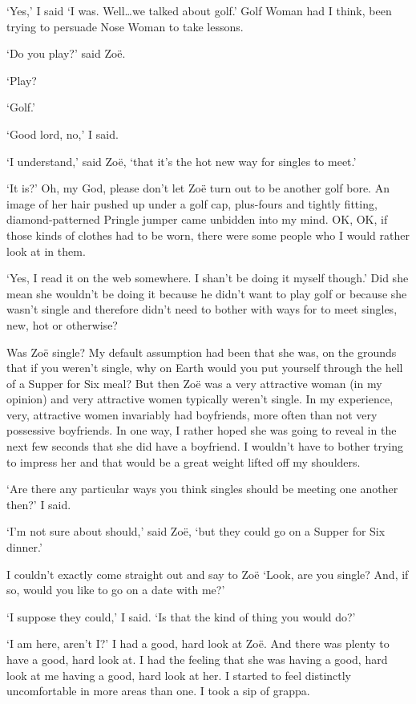 `Yes,' I said `I was. Well\dots we talked about golf.' Golf Woman had
I think, been trying to persuade Nose Woman to take lessons.

`Do you play?' said Zoë.

`Play?

`Golf.'

`Good lord, no,' I said.

`I understand,' said Zoë, `that it's the hot new way for singles to
meet.'

`It is?' Oh, my God, please don't let Zoë turn out to be another
golf bore. An image of her hair pushed up under a golf cap,
plus-fours and tightly fitting, diamond-patterned Pringle jumper came
unbidden into my mind. OK, OK, if those kinds of clothes had to be
worn, there were some people who I would rather look at in
them.

`Yes, I read it on the web somewhere. I shan't be doing it myself
though.' Did she mean she wouldn't be doing it because he didn't
want to play golf or because she wasn't single and therefore didn't
need to bother with ways for to meet singles, new, hot or otherwise?

Was Zoë single? My default assumption had been that she was, on
the grounds that if you weren't single, why on Earth would you put
yourself through the hell of a Supper for Six meal? But then
Zoë was a very attractive woman (in my opinion) and very
attractive women typically weren't single. In my experience, very,
attractive women invariably had boyfriends, more often than not very
possessive boyfriends. In one way, I rather hoped she was going to
reveal in the next few seconds that she did have a boyfriend. I
wouldn't have to bother trying to impress her and that would be a
great weight lifted off my shoulders.

`Are there any particular ways you think singles should be meeting
one another then?' I said.

`I'm not sure about {\twelveit should\/},' said Zoë, `but they
could go on a Supper for Six dinner.'

I couldn't exactly come straight out and say to Zoë `Look, are
you single? And, if so, would you like to go on a date with me?'

`I suppose they could,' I said. `Is that the kind of thing you would
do?'

`I am here, aren't I?' I had a good, hard look at Zoë. And
there was plenty to have a good, hard look at. I had the feeling
that she was having a good, hard look at me having a good, hard
look at her. I started to feel distinctly uncomfortable in more
areas than one. I took a sip of grappa.

